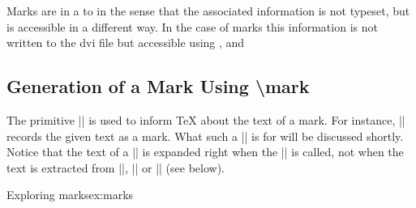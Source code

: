 Marks are in a  to  in the sense that the 
associated information is not typeset, but is accessible in a different way. In the 
case of marks this information is not written to the dvi file but accessible using 
,  and 

\subsection{Generation of a Mark Using \textbackslash mark}
 
The primitive |\mark| is used to inform TeX about the text of a mark. For instance, 
|\mark| records the given text as a mark. What such a |\mark| is for 
will be discussed shortly. Notice that the text of a |\mark| is expanded right when 
the |\mark| is called, not when the text is extracted from |\topmark|, |\firstmark| 
or |\botmark| (see below). 

\begin{texexample}{Exploring marks}{ex:marks}
\meaning\mark

\meaning\topmark

\meaning\firstmark

\meaning\botmark
\end{texexample}



